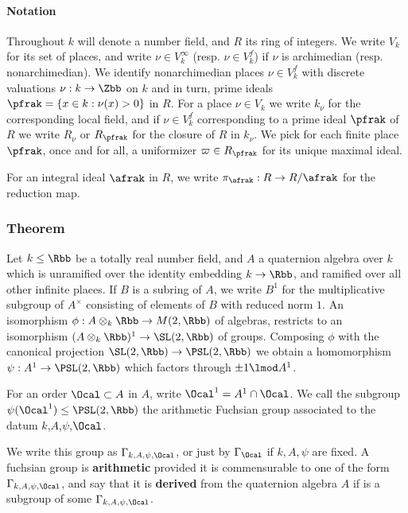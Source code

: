 \paragraph{Notation}
Throughout $k$ will denote a number field, and $R$ its ring of integers. We write $V_k$ for its set of places, and write $\nu \in V_k^\infty$ (resp. $\nu \in V_k^f$) if $\nu$ is archimedian (resp. nonarchimedian).
We identify nonarchimedian places $\nu \in V_k^f$ with discrete valuations $\nu : k \to \Zbb$ on $k$ and in turn, prime ideals $\pfrak = \{ x \in k: \nu(x) > 0\}$ in $R$.
For a place $\nu \in V_k$ we write $k_\nu$ for the corresponding local field, and if $\nu \in V_k^f$ corresponding to a prime ideal $\pfrak$ of $R$ we write $R_\nu$ or $R_\pfrak$ for the closure of $R$ in $k_\nu$.
We pick for each finite place $\pfrak$, once and for all, a uniformizer $\varpi \in R_\pfrak$ for its unique maximal ideal.

For an integral ideal $\afrak$ in $R$, we write $\pi_\afrak : R \to R/\afrak$ for the reduction map.
\subsubsection{Theorem}
Let $k \leq \Rbb$ be a totally real number field, and $A$ a quaternion algebra over $k$ which is unramified over the identity embedding $k\to \Rbb$, and ramified over all other infinite places.
If $B$ is a subring of $A$, we write $B^1$ for the multiplicative subgroup of $A^\times$ consisting of elements of $B$ with reduced norm $1$.
An isomorphism $\phi : A\otimes_k \Rbb \to M(2,\Rbb)$ of algebras, restricts to an isomorphism $(A\otimes_k \Rbb)^1 \to \SL(2,\Rbb)$ of groups. Composing $\phi$ with the canonical projection $\SL(2,\Rbb)  \to \PSL(2,\Rbb)$ we obtain a homomorphism $\psi : A^1 \to \PSL(2,\Rbb)$ which factors through $\pm 1 \lmod A^1$.

For an order  $\Ocal \subset A$ in $A$, write $\Ocal^1 = A^1 \cap \Ocal$. We call the subgroup $\psi(\Ocal^1)\leq \PSL(2,\Rbb)$ the arithmetic Fuchsian group associated to the datum $k$,$A$,$\psi$,$\Ocal$.

We write this group as $\Gamma_{k,A,\psi,\Ocal}$, or just by $\Gamma_\Ocal$ if $k,A,\psi$ are fixed. A fuchsian group is \textbf{arithmetic} provided it is commensurable to one of the form $\Gamma_{k,A,\psi,\Ocal}$, and say that it is \textbf{derived} from the quaternion algebra $A$ if is a subgroup of some $\Gamma_{k,A,\psi,\Ocal}$.

